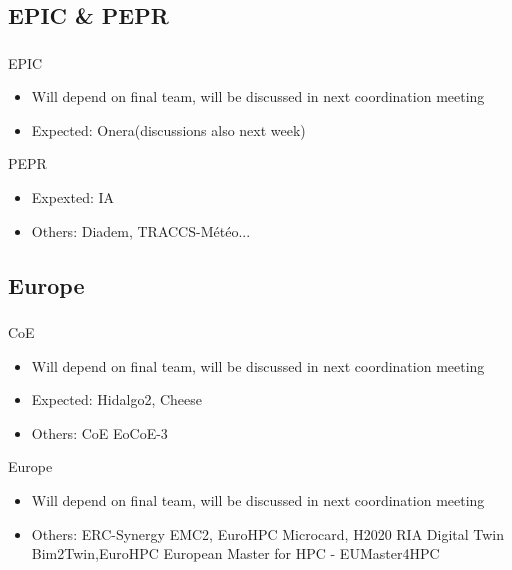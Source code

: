 \subsection{EPIC \& PEPR}
\begin{frame}
  \frametitle{\insertsectionhead}
  \framesubtitle{\insertsubsectionhead}
\begin{alertblock}{EPIC}
  \begin{itemize}
    \item  Will depend on final team, will be discussed in next coordination meeting
    \item Expected: Onera(discussions also next week)
  \end{itemize}
\end{alertblock}

\begin{alertblock}{PEPR}
  \begin{itemize}
    \item Expexted: IA
    \item Others: Diadem, TRACCS-Météo...
  \end{itemize}
\end{alertblock}

\end{frame}

\subsection{Europe}
\begin{frame}
  \frametitle{\insertsectionhead}
  \framesubtitle{\insertsubsectionhead}
  \begin{alertblock}{CoE}
    \begin{itemize}
      \item Will depend on final team, will be discussed in next coordination meeting
      \item Expected: Hidalgo2, Cheese
      \item Others: CoE	EoCoE-3
    \end{itemize}
  \end{alertblock}

  \begin{alertblock}{Europe}
    \begin{itemize}
      \item Will depend on final team, will be discussed in next coordination meeting
      \item Others: ERC-Synergy	EMC2, EuroHPC	Microcard, H2020 RIA Digital Twin	Bim2Twin,EuroHPC	European Master for HPC - EUMaster4HPC	
    \end{itemize}
  \end{alertblock}
\end{frame}

